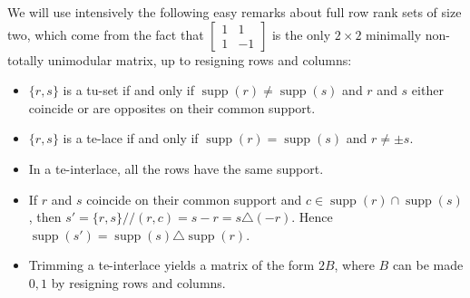 \documentclass[11pt,a4paper]{amsart}
\renewcommand*{\geq}{\geqslant}
\newcommand\orange[1]{{\color{green!60!black}\rmfamily#1}}
\theoremstyle{plain}
\newtheorem{theorem}{Theorem}[section]%
\newtheorem{corollary}[theorem]{Corollary}
\theoremstyle{definition}
\DeclareMathOperator{\supp}{supp}
\begin{document}
We will use intensively the following easy remarks about full row rank sets of size two, which come from the fact that $\begin{bmatrix}1 & 1\\1 & -1\end{bmatrix}$ is the only $2\times 2$ minimally non-totally unimodular matrix, up to resigning rows and columns:%
\begin{itemize}
	\item[\textbullet] $\{r,s\}$ is a tu-set if and only if $\supp(r)\neq\supp(s)$ and $r$ and $s$ either coincide or are opposites on their common support.
	\item[\textbullet] $\{r,s\}$ is a te-lace if and only if $\supp(r)=\supp(s)$ and $r\neq\pm s$.
	\item[\textbullet] In a te-interlace, all the rows have the same support.
	\item[\textbullet] If $r$ and $s$ coincide on their common support and $c\in\supp(r)\cap\supp(s)$, then $s'=\{r,s\}/\!\!/(r,c)= s-r = s\triangle(-r)$.
	Hence $\supp(s')=\supp(s)\triangle\supp(r)$.
	\item[\textbullet] Trimming a te-interlace yields a matrix of the form $2B$, where $B$ can be made $0,\!1$ by resigning rows and columns.
\end{itemize}




%	
%
\end{document}
